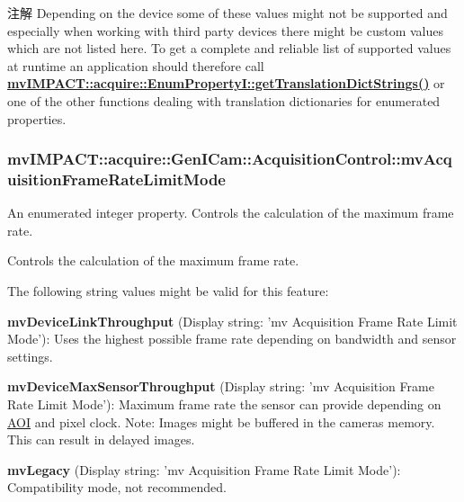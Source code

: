 \begin{DoxyNote}{注解}
Depending on the device some of these values might not be supported and especially when working with third party devices there might be custom values which are not listed here. To get a complete and reliable list of supported values at runtime an application should therefore call {\bfseries \hyperlink{classmv_i_m_p_a_c_t_1_1acquire_1_1_enum_property_i_a0ba6ccbf5ee69784d5d0b537924d26b6}{mv\+I\+M\+P\+A\+C\+T\+::acquire\+::\+Enum\+Property\+I\+::get\+Translation\+Dict\+Strings()}} or one of the other functions dealing with translation dictionaries for enumerated properties. 
\end{DoxyNote}
\hypertarget{classmv_i_m_p_a_c_t_1_1acquire_1_1_gen_i_cam_1_1_acquisition_control_a746647afd1fec502036cb9f6633f030a}{
\subsubsection[{mv\+Acquisition\+Frame\+Rate\+Limit\+Mode}]{ mv\+I\+M\+P\+A\+C\+T\+::acquire\+::\+Gen\+I\+Cam\+::\+Acquisition\+Control\+::mv\+Acquisition\+Frame\+Rate\+Limit\+Mode}}\label{classmv_i_m_p_a_c_t_1_1acquire_1_1_gen_i_cam_1_1_acquisition_control_a746647afd1fec502036cb9f6633f030a}


An enumerated integer property. Controls the calculation of the maximum frame rate. 

Controls the calculation of the maximum frame rate.

The following string values might be valid for this feature\+:
\begin{DoxyItemize}
\item {\bfseries mv\+Device\+Link\+Throughput} (Display string\+: 'mv Acquisition Frame Rate Limit Mode')\+: Uses the highest possible frame rate depending on bandwidth and sensor settings.
\item {\bfseries mv\+Device\+Max\+Sensor\+Throughput} (Display string\+: 'mv Acquisition Frame Rate Limit Mode')\+: Maximum frame rate the sensor can provide depending on \hyperlink{struct_a_o_i}{A\+O\+I} and pixel clock. Note\+: Images might be buffered in the cameras memory. This can result in delayed images.
\item {\bfseries mv\+Legacy} (Display string\+: 'mv Acquisition Frame Rate Limit Mode')\+: Compatibility mode, not recommended.
\end{DoxyItemize}

